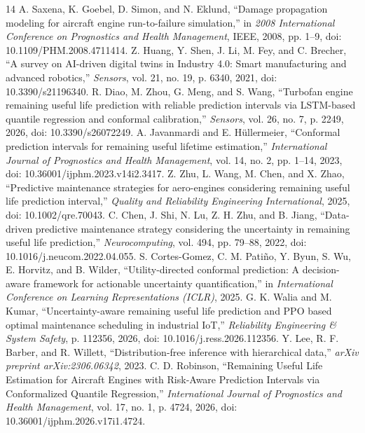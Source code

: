 \documentclass[12pt,a4paper]{article}
\begin{document}
\begin{thebibliography}{14}
 A. Saxena, K. Goebel, D. Simon, and N. Eklund, ``Damage propagation modeling for aircraft engine run-to-failure simulation,'' in \textit{2008 International Conference on Prognostics and Health Management}, IEEE, 2008, pp. 1--9, doi: 10.1109/PHM.2008.4711414.
 Z. Huang, Y. Shen, J. Li, M. Fey, and C. Brecher, ``A survey on AI-driven digital twins in Industry 4.0: Smart manufacturing and advanced robotics,'' \textit{Sensors}, vol. 21, no. 19, p. 6340, 2021, doi: 10.3390/s21196340.
 R. Diao, M. Zhou, G. Meng, and S. Wang, ``Turbofan engine remaining useful life prediction with reliable prediction intervals via LSTM-based quantile regression and conformal calibration,'' \textit{Sensors}, vol. 26, no. 7, p. 2249, 2026, doi: 10.3390/s26072249.
 A. Javanmardi and E. H{\"u}llermeier, ``Conformal prediction intervals for remaining useful lifetime estimation,'' \textit{International Journal of Prognostics and Health Management}, vol. 14, no. 2, pp. 1--14, 2023, doi: 10.36001/ijphm.2023.v14i2.3417.
 Z. Zhu, L. Wang, M. Chen, and X. Zhao, ``Predictive maintenance strategies for aero-engines considering remaining useful life prediction interval,'' \textit{Quality and Reliability Engineering International}, 2025, doi: 10.1002/qre.70043.
 C. Chen, J. Shi, N. Lu, Z. H. Zhu, and B. Jiang, ``Data-driven predictive maintenance strategy considering the uncertainty in remaining useful life prediction,'' \textit{Neurocomputing}, vol. 494, pp. 79--88, 2022, doi: 10.1016/j.neucom.2022.04.055.
 S. Cortes-Gomez, C. M. Pati{\~n}o, Y. Byun, S. Wu, E. Horvitz, and B. Wilder, ``Utility-directed conformal prediction: A decision-aware framework for actionable uncertainty quantification,'' in \textit{International Conference on Learning Representations (ICLR)}, 2025.
 G. K. Walia and M. Kumar, ``Uncertainty-aware remaining useful life prediction and PPO based optimal maintenance scheduling in industrial IoT,'' \textit{Reliability Engineering \& System Safety}, p. 112356, 2026, doi: 10.1016/j.ress.2026.112356.
 Y. Lee, R. F. Barber, and R. Willett, ``Distribution-free inference with hierarchical data,'' \textit{arXiv preprint arXiv:2306.06342}, 2023.
 C. D. Robinson, ``Remaining Useful Life Estimation for Aircraft Engines with Risk-Aware Prediction Intervals via Conformalized Quantile Regression,'' \textit{International Journal of Prognostics and Health Management}, vol. 17, no. 1, p. 4724, 2026, doi: 10.36001/ijphm.2026.v17i1.4724.

\end{thebibliography}
\end{document}
